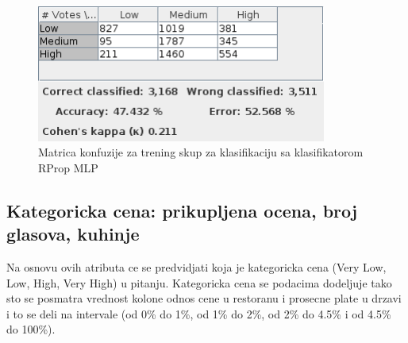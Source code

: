 \documentclass[11pt]{article} %
\begin{document}
\begin{figure}[h!]
	\centering
	\includegraphics[width=0.85\textwidth]{votesClassificationTraining/RProp}
	\caption{Matrica konfuzije za trening skup za klasifikaciju sa klasifikatorom RProp MLP}
\end{figure}

\newpage
\subsection{Kategoricka cena: prikupljena ocena, broj glasova, kuhinje}
Na osnovu ovih atributa ce se predvidjati koja je kategoricka cena (Very Low, Low, High, Very High) u pitanju.
Kategoricka cena se podacima dodeljuje tako sto se posmatra vrednost kolone odnos cene u restoranu i prosecne plate u drzavi i to se deli na intervale (od 0\% do 
1\%, od 1\% do 2\%, od 2\% do 4.5\% i od 4.5\% do 100\%).
\end{document}
